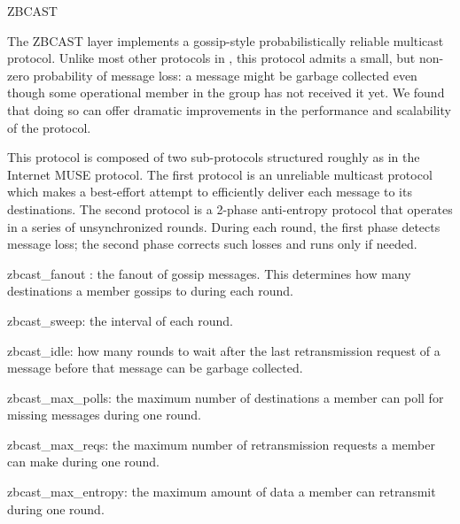 %
%
%
\begin{Layer}{ZBCAST}

The ZBCAST layer implements a gossip-style probabilistically reliable
multicast protocol.  Unlike most other protocols in \ensemble, this
protocol admits a small, but non-zero probability of message loss: a
message might be garbage collected even though some operational member
in the group has not received it yet.  We found that doing so can
offer dramatic improvements in the performance and scalability of the
protocol.


\begin{Protocol}
This protocol is composed of two sub-protocols structured roughly as in the
Internet MUSE protocol.  The first protocol is an unreliable multicast
protocol which makes a best-effort attempt to efficiently deliver each
message to its destinations.  The second protocol is a 2-phase
anti-entropy protocol that operates in a series of unsynchronized
rounds.  During each round, the first phase detects message loss; the
second phase corrects such losses and runs only if needed.
\end{Protocol}

\begin{Parameters}
\item zbcast\_fanout : the fanout of gossip messages.  This determines
how many destinations a member gossips to during each round.

\item zbcast\_sweep: the interval of each round.

\item zbcast\_idle: how many rounds to wait after the last
retransmission request of a message before that message can be garbage
collected.

\item zbcast\_max\_polls: the maximum number of destinations a member
can poll for missing messages during one round.

\item zbcast\_max\_reqs: the maximum number of retransmission requests
a member can make during one round.

\item zbcast\_max\_entropy: the maximum amount of data a member can
retransmit during one round.


\end{Parameters}
\end{Layer}
